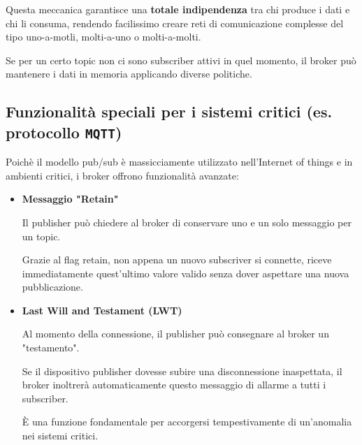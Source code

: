 Questa meccanica garantisce una \textbf{totale indipendenza} tra chi produce i dati e chi li consuma, rendendo facilissimo creare reti di comunicazione complesse del tipo uno-a-motli, molti-a-uno o molti-a-molti.

Se per un certo topic non ci sono subscriber attivi in quel momento, il broker può mantenere i dati in memoria applicando diverse politiche.

\subsection{Funzionalità speciali per i sistemi critici (es. protocollo \texttt{MQTT})}
Poichè il modello pub/sub è massicciamente utilizzato nell'Internet of things e in ambienti critici, i broker offrono funzionalità avanzate:
\begin{itemize}
    \item \textbf{Messaggio "Retain"}

    Il publisher può chiedere al broker di conservare uno e un solo messaggio per un topic.

    Grazie al flag retain, non appena un nuovo subscriver si connette, riceve immediatamente quest'ultimo valore valido senza dover aspettare una nuova pubblicazione.

    \item \textbf{Last Will and Testament (LWT)}

    Al momento della connessione, il publisher può consegnare al broker un "testamento".

    Se il dispositivo publisher dovesse subire una disconnessione inaspettata, il broker inoltrerà automaticamente questo messaggio di allarme a tutti i subscriber.

    È una funzione fondamentale per accorgersi tempestivamente di un'anomalia nei sistemi critici.
\end{itemize}